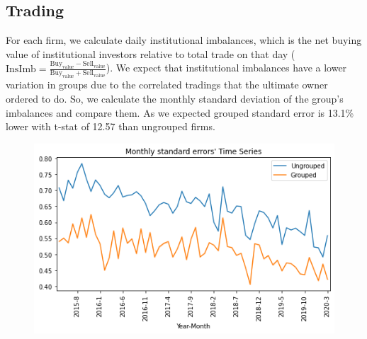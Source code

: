 \documentclass[12pt, a4paper]{article}
\begin{document}
\subsection*{Trading}
 
For each firm, we calculate daily institutional imbalances, which is the net buying value of institutional investors relative to total trade on that day ($ \text{InsImb} = \frac{\text{Buy}_{\text{value}} - \text{Sell}_{\text{value}}}{\text{Buy}_{\text{value}} + \text{Sell}_{\text{value}}} $). 
We expect that institutional imbalances have a lower variation in groups due to the correlated tradings that the ultimate owner ordered to do. So, we calculate the monthly standard deviation of the group's imbalances and compare them. As we expected grouped standard error is  13.1\% lower with t-stat of 12.57 than ungrouped firms. 

\begin{table}[htbp]
	\centering
	\label{tab:addlabel}%
\end{table}%



\begin{figure}[htbp]
	\centering
	\includegraphics[width=0.8\linewidth]{GroupedSTD}
	\label{fig:groupedstd}
\end{figure}
\end{document}
